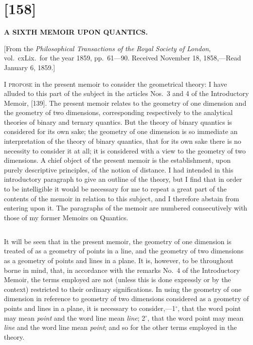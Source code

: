 \documentclass[12pt,a4paper]{article}
\begin{document}
\newpage
\section*{[158]}

\begin{center}
\Large\textbf{A SIXTH MEMOIR UPON QUANTICS.}
\end{center}

\begin{center}
\small[From the \textit{Philosophical Transactions of the Royal Society of London}, vol.~cxLix.\ for the year 1859, pp.~61---90. Received November 18, 1858,---Read January 6, 1859.]
\end{center}

\textsc{I propose} in the present memoir to consider the geometrical theory: I have alluded to this part of the subject in the articles Nos.~3 and 4 of the Introductory Memoir, [139]. The present memoir relates to the geometry of one dimension and the geometry of two dimensions, corresponding respectively to the analytical theories of binary and ternary quantics. But the theory of binary quantics is considered for its own sake; the geometry of one dimension is so immediate an interpretation of the theory of binary quantics, that for its own sake there is no necessity to consider it at all; it is considered with a view to the geometry of two dimensions. A chief object of the present memoir is the establishment, upon purely descriptive principles, of the notion of distance. I had intended in this introductory paragraph to give an outline of the theory, but I find that in order to be intelligible it would be necessary for me to repeat a great part of the contents of the memoir in relation to this subject, and I therefore abstain from entering upon it. The paragraphs of the memoir are numbered consecutively with those of my former Memoirs on Quantics.

\setcounter{subsection}{146}

\subsection{}

It will be seen that in the present memoir, the geometry of one dimension is treated of as a geometry of points in a line, and the geometry of two dimensions as a geometry of points and lines in a plane. It is, however, to be throughout borne in mind, that, in accordance with the remarks No.~4 of the Introductory Memoir, the terms employed are not (unless this is done expressly or by the context) restricted to their ordinary significations. In using the geometry of one dimension in reference to geometry of two dimensions considered as a geometry of points and lines in a plane, it is necessary to consider,---1$^\circ$, that the word point may mean \textit{point} and the word line mean \textit{line}; 2$^\circ$, that the word point may mean \textit{line} and the word line mean \textit{point}; and so for the other terms employed in the theory.
\end{document}
